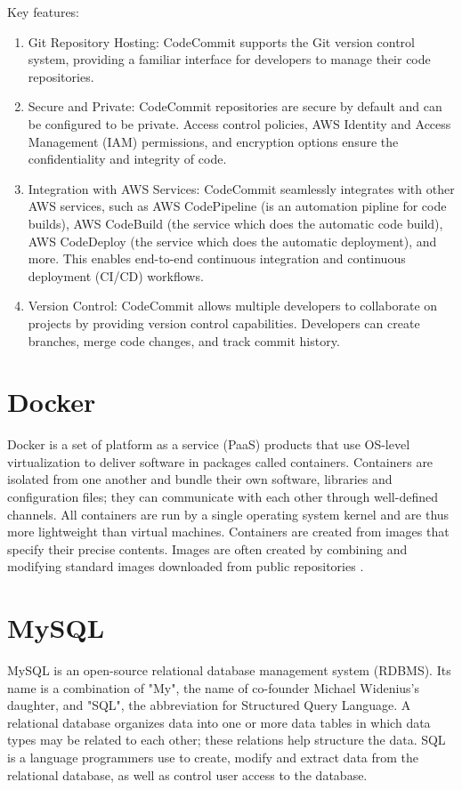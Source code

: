 \documentclass[11pt,a4paper,oneside]{report}
\begin{document}
Key features:
\begin{enumerate}
  \item Git Repository Hosting: CodeCommit supports the Git version control system, providing a familiar interface for developers to manage their code repositories.
  \item Secure and Private: CodeCommit repositories are secure by default and can be configured to be private. Access control policies, AWS Identity and Access Management (IAM) permissions, and encryption options ensure the confidentiality and integrity of code.
  \item Integration with AWS Services: CodeCommit seamlessly integrates with other AWS services, such as AWS CodePipeline (is an automation pipline for code builds), AWS CodeBuild (the service which does the automatic code build), AWS CodeDeploy (the service which does the automatic deployment), and more. This enables end-to-end continuous integration and continuous deployment (CI/CD) workflows.
  \item Version Control: CodeCommit allows multiple developers to collaborate on projects by providing version control capabilities. Developers can create branches, merge code changes, and track commit history.
\end{enumerate}

\section{Docker}

Docker is a set of platform as a service (PaaS) products that use OS-level virtualization to deliver software in packages called containers. Containers are isolated from one another and bundle their own software, libraries and configuration files; they can communicate with each other through well-defined channels. All containers are run by a single operating system kernel and are thus more lightweight than virtual machines. Containers are created from images that specify their precise contents. Images are often created by combining and modifying standard images downloaded from public repositories \cite{docker}.

\section{MySQL}
MySQL is an open-source relational database management system (RDBMS). Its name is a combination of "My", the name of co-founder Michael Widenius's daughter, and "SQL", the abbreviation for Structured Query Language. A relational database organizes data into one or more data tables in which data types may be related to each other; these relations help structure the data. SQL is a language programmers use to create, modify and extract data from the relational database, as well as control user access to the database.
\end{document}
